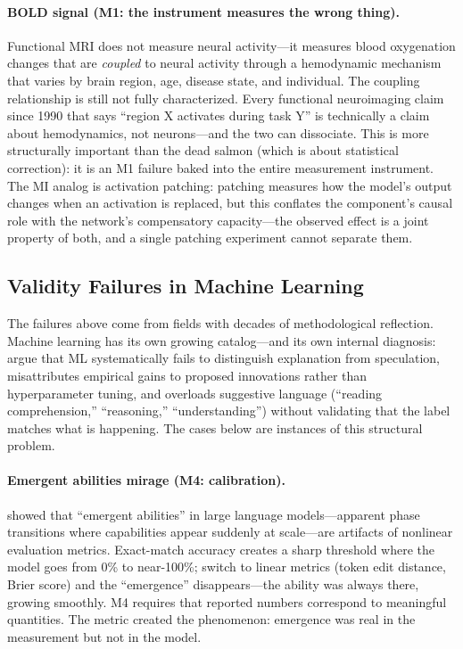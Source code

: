 \documentclass{article}
\begin{document}
\paragraph{BOLD signal (M1: the instrument measures the wrong thing).}
Functional MRI does not measure neural activity---it measures blood oxygenation changes that are \emph{coupled} to neural activity through a hemodynamic mechanism that varies by brain region, age, disease state, and individual. The coupling relationship is still not fully characterized. Every functional neuroimaging claim since 1990 that says ``region X activates during task Y'' is technically a claim about hemodynamics, not neurons---and the two can dissociate. This is more structurally important than the dead salmon (which is about statistical correction): it is an M1 failure baked into the entire measurement instrument. The MI analog is activation patching: patching measures how the model's output changes when an activation is replaced, but this conflates the component's causal role with the network's compensatory capacity---the observed effect is a joint property of both, and a single patching experiment cannot separate them.

\subsection{Validity Failures in Machine Learning}

The failures above come from fields with decades of methodological reflection. Machine learning has its own growing catalog---and its own internal diagnosis: \citet{lipton2019troubling} argue that ML systematically fails to distinguish explanation from speculation, misattributes empirical gains to proposed innovations rather than hyperparameter tuning, and overloads suggestive language (``reading comprehension,'' ``reasoning,'' ``understanding'') without validating that the label matches what is happening. The cases below are instances of this structural problem.

\paragraph{Emergent abilities mirage (M4: calibration).}
\citet{schaeffer2024emergent} showed that ``emergent abilities'' in large language models---apparent phase transitions where capabilities appear suddenly at scale---are artifacts of nonlinear evaluation metrics. Exact-match accuracy creates a sharp threshold where the model goes from 0\% to near-100\%; switch to linear metrics (token edit distance, Brier score) and the ``emergence'' disappears---the ability was always there, growing smoothly. M4 requires that reported numbers correspond to meaningful quantities. The metric created the phenomenon: emergence was real in the measurement but not in the model.
\end{document}
